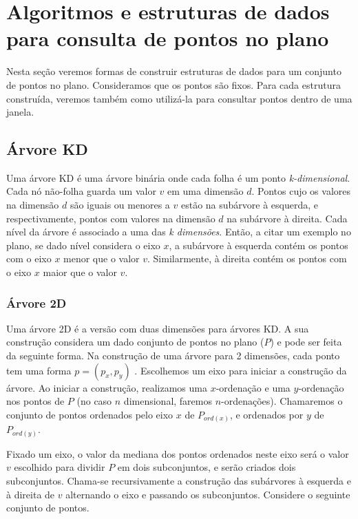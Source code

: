 \chapter{Algoritmos e estruturas de dados para consulta de pontos no plano}\label{cap:desenvolvimento}
Nesta seção veremos formas de construir estruturas de dados para um conjunto de pontos no plano. 
Consideramos que os pontos são fixos. Para cada estrutura construída, veremos também como utilizá-la para
consultar pontos dentro de uma janela.

\section{Árvore KD}

Uma árvore KD é uma árvore binária onde cada folha é um ponto \textit{k-dimensional}.
Cada nó não-folha guarda um valor $v$ em uma dimensão $d$.
Pontos cujo os valores na dimensão $d$ são iguais ou menores a $v$ estão na subárvore à esquerda,
e respectivamente, pontos com valores na dimensão $d$ na subárvore à direita.
Cada nível da árvore é associado a uma das \textit{k dimensões}. Então, a citar um exemplo no plano,
se dado nível considera o eixo $x$, a subárvore à esquerda contém os pontos com o eixo $x$ menor que o valor 
$v$. Similarmente, à direita contém os pontos com o eixo $x$ maior que o valor $v$.

\subsection{Árvore 2D}
Uma árvore 2D é a versão com duas dimensões para árvores KD. A sua construção considera um dado conjunto 
de pontos no plano ($P$) e pode ser feita da seguinte forma. Na construção de uma árvore para 2 dimensões,
cada ponto tem uma forma $p = (p_x, p_y)$ . Escolhemos um eixo para iniciar a construção da árvore.
Ao iniciar a construção, realizamos uma $x$-ordenação e uma $y$-ordenação nos pontos de $P$
(no caso $n$ dimensional, faremos $n$-ordenações). Chamaremos o conjunto de pontos ordenados pelo eixo
$x$ de $P_{ord(x)}$, e ordenados por $y$ de $P_{ord(y)}$.

Fixado um eixo, o valor da mediana dos pontos ordenados neste eixo será o valor $v$ escolhido para dividir
$P$ em dois subconjuntos, e serão criados dois subconjuntos. Chama-se recursivamente a
construção das subárvores à esquerda e à direita de $v$ alternando o eixo e passando os subconjuntos.
Considere o seguinte conjunto de pontos.

